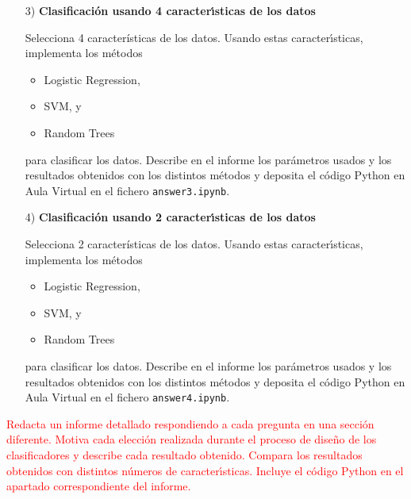 \documentclass{article}
\begin{document}
\begin{itemize}

\item[3)] {\bf Clasificaci\'on usando 4 caracter\'{\i}sticas de los datos}

Selecciona 4 caracter\'isticas de los datos. Usando estas caracter\'{\i}sticas, implementa los m\'etodos 

\begin{itemize}

\item
Logistic Regression, 

\item
SVM, y

\item
Random Trees

\end{itemize}

para clasificar los datos. Describe en el informe los par\'ametros usados y los resultados obtenidos con los distintos m\'etodos y deposita el c\'odigo Python en Aula Virtual en el fichero \texttt{answer3.ipynb}.

\end{itemize}

\bigskip

\begin{itemize}

\item[4)] {\bf Clasificaci\'on usando 2 caracter\'{\i}sticas de los datos}

Selecciona 2 caracter\'isticas de los datos. Usando estas caracter\'{\i}sticas, implementa los m\'etodos 

\begin{itemize}

\item
Logistic Regression, 

\item
SVM, y

\item
Random Trees

\end{itemize}

para clasificar los datos. Describe en el informe los par\'ametros usados y los resultados obtenidos con los distintos m\'etodos y deposita el c\'odigo Python en Aula Virtual en el fichero \texttt{answer4.ipynb}.

\end{itemize}

\bigskip

\noindent
\textcolor{red}{
Redacta un informe detallado respondiendo a cada pregunta en una secci\'on diferente. Motiva cada elecci\'on realizada durante el proceso de dise\~no de los clasificadores y describe cada resultado obtenido. Compara los resultados obtenidos con distintos n\'umeros de caracter\'{\i}sticas. Incluye el c\'odigo Python en el apartado correspondiente del informe. 
} 
\end{document}
